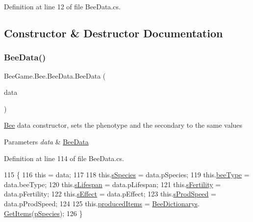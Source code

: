 Definition at line 12 of file Bee\+Data.\+cs.



\subsection{Constructor \& Destructor Documentation}
\mbox{\label{struct_bee_game_1_1_bee_1_1_bee_data_ae105a46ac786f4ba927efeaf4ef02f86}} 
\subsubsection{\texorpdfstring{Bee\+Data()}{BeeData()}}
{\footnotesize\ttfamily Bee\+Game.\+Bee.\+Bee\+Data.\+Bee\+Data (\begin{DoxyParamCaption}\item[{\hyperlink{struct_bee_game_1_1_bee_1_1_bee_data}{Bee\+Data}}]{data }\end{DoxyParamCaption})}



\hyperlink{namespace_bee_game_1_1_bee}{Bee} data constructor, sets the phenotype and the secondary to the same values 


\begin{DoxyParams}{Parameters}
{\em data} & \hyperlink{struct_bee_game_1_1_bee_1_1_bee_data}{Bee\+Data}\\
\hline
\end{DoxyParams}


Definition at line 114 of file Bee\+Data.\+cs.


\begin{DoxyCode}
115         \{
116             \textcolor{keyword}{this} = data;
117 
118             this.\hyperlink{struct_bee_game_1_1_bee_1_1_bee_data_add33b8a3084a342ad7176a9366c2fc55}{sSpecies} = data.pSpecies;
119             this.\hyperlink{struct_bee_game_1_1_bee_1_1_bee_data_acfb6e209ae7bd1b52928580fcce4c743}{beeType} = data.beeType;
120             this.\hyperlink{struct_bee_game_1_1_bee_1_1_bee_data_af5c384db9813e463bb0d66cb8b443d87}{sLifespan} = data.pLifespan;
121             this.\hyperlink{struct_bee_game_1_1_bee_1_1_bee_data_a20a4084334bbbba3942f67622596b596}{sFertility} = data.pFertility;
122             this.\hyperlink{struct_bee_game_1_1_bee_1_1_bee_data_ac65b550d77e529a62cb60acf86502bc2}{sEffect} = data.pEffect;
123             this.\hyperlink{struct_bee_game_1_1_bee_1_1_bee_data_af2e94ee206fd06b8314888f8ba3d56e9}{sProdSpeed} = data.pProdSpeed;
124 
125             this.\hyperlink{struct_bee_game_1_1_bee_1_1_bee_data_a3c49396295407e1744f501e86c32d61c}{producedItems} = \hyperlink{class_bee_game_1_1_core_1_1_bee_dictionarys}{BeeDictionarys}.
      \hyperlink{class_bee_game_1_1_core_1_1_bee_dictionarys_a2cd137701cfdcfeb25d5e7a73397e1b4}{GetItems}(\hyperlink{struct_bee_game_1_1_bee_1_1_bee_data_a87db9add2bcc463ab444eb4ac7a4e228}{pSpecies});
126         \}
\end{DoxyCode}


